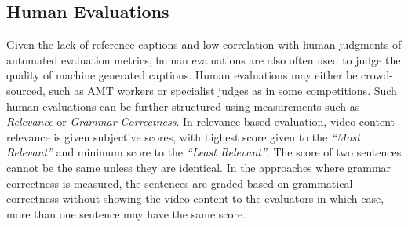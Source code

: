 \documentclass[10pt,journal,compsoc]{IEEEtran}
\begin{document}
\subsection{Human Evaluations}
Given the lack of reference captions and low correlation with human judgments of automated evaluation metrics, human evaluations are also often used to judge the quality of machine generated captions. Human evaluations may either be crowd-sourced, such as AMT workers or specialist judges as in some competitions. Such human evaluations can be  further structured using measurements such as \textit{Relevance} or \textit{Grammar Correctness}. In relevance based evaluation, video content relevance is given subjective scores, with highest score given to the \textit{``Most Relevant''} and minimum score to the \textit{``Least Relevant''}. The score of two sentences cannot be the same unless they are identical. In the approaches where grammar correctness is measured, the sentences are graded based on grammatical correctness without showing the video content to the evaluators in which case, more than one sentence may have the same score.

\vspace{-3mm}
\end{document}
